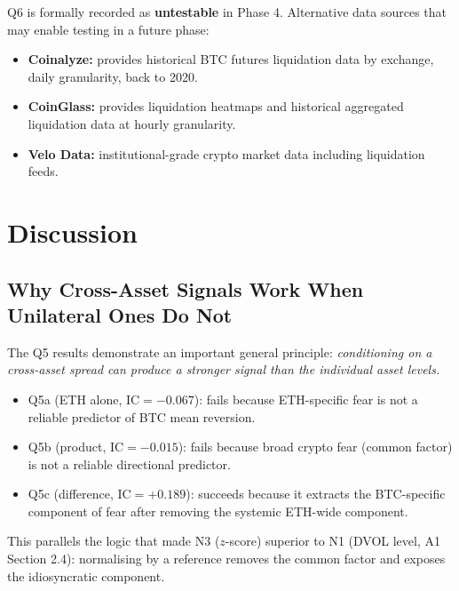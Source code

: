 \documentclass[12pt, a4paper]{article}
\theoremstyle{plain}
\theoremstyle{definition}
\newcommand{\IC}{\mathrm{IC}}
\begin{document}
Q6 is formally recorded as \textbf{untestable} in Phase 4.  Alternative
data sources that may enable testing in a future phase:

\begin{itemize}[noitemsep]
  \item \textbf{Coinalyze:} provides historical BTC futures liquidation
        data by exchange, daily granularity, back to 2020.
  \item \textbf{CoinGlass:} provides liquidation heatmaps and historical
        aggregated liquidation data at hourly granularity.
  \item \textbf{Velo Data:} institutional-grade crypto market data
        including liquidation feeds.
\end{itemize}

\section{Discussion}
\label{sec:discussion}

\subsection{Why Cross-Asset Signals Work When Unilateral Ones Do Not}

The Q5 results demonstrate an important general principle: \emph{conditioning
on a cross-asset spread can produce a stronger signal than the individual
asset levels.}

\begin{itemize}
  \item Q5a (ETH alone, $\IC = -0.067$): fails because ETH-specific fear
        is not a reliable predictor of BTC mean reversion.
  \item Q5b (product, $\IC = -0.015$): fails because broad crypto fear
        (common factor) is not a reliable directional predictor.
  \item Q5c (difference, $\IC = +0.189$): succeeds because it extracts the
        BTC-specific component of fear after removing the systemic ETH-wide
        component.
\end{itemize}

This parallels the logic that made N3 ($z$-score) superior to N1 (DVOL
level, A1 Section 2.4): normalising by a reference removes the common
factor and exposes the idiosyncratic component.
\end{document}
